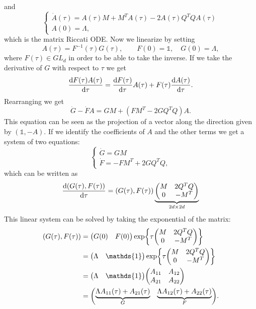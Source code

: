 and
\begin{equation*}
    \begin{cases}
        \dot{A}(\tau) = A(\tau)M + M^TA(\tau) - 2A(\tau)Q^TQA(\tau) \\
        A(0) = \Lambda,
    \end{cases}
\end{equation*}
which is the matrix Riccati ODE. Now we linearize by setting
\begin{equation*}
    A(\tau) = F^{-1}(\tau)G(\tau), \qquad F(0) = \mathds{1}, \quad G(0) = \Lambda,
\end{equation*}
where $F(\tau)\in GL_d$ in order to be able to take the inverse. If we take the derivative of $G$ with respect to $\tau$ we get
\begin{equation*}
    \dv{F(\tau)A(\tau)}{\tau} = \dv{F(\tau)}{\tau} A(\tau) + F(\tau)\dv{A(\tau)}{\tau}.
\end{equation*}
Rearranging we get
\begin{equation}
    \dot{G} - \dot{F}A = GM + (FM^T - 2GQ^TQ)A.
\end{equation}
This equation can be seen as the projection of a vector along the direction given by $(\mathds{1}, -A)$. If we identify the coefficients of $A$ and the other terms we get a system of two equations:
\begin{equation}
    \begin{cases}
        \dot{G} = GM \\
        \dot{F} = -FM^T + 2GQ^TQ,
    \end{cases}
\end{equation}
which can be written as
\begin{equation}
    \dv{(G(\tau), F(\tau))}{\tau} = (G(\tau), F(\tau))\underbrace{\mqty(M & 2Q^TQ \\ 0 & -M^T)}_{2d\times 2d}
\end{equation}
This linear system can be solved by taking the exponential of the matrix:
\begin{align}%
    \notag(G(\tau), F(\tau)) &= \mqty(G(0) & F(0))\exp{\tau\mqty(M & 2Q^TQ \\ 0 & -M^T)} \\
    &=
    \notag\mqty(\Lambda & \mathds{1})\exp{\tau\mqty(M & 2Q^TQ \\ 0 & -M^T)} \\
    &=
    \notag\mqty(\Lambda & \mathds{1})\mqty(A_{11} & A_{12} \\ A_{21} & A_{22}) \\
    &=
    \mqty(\underbrace{\Lambda A_{11}(\tau) + A_{21}(\tau)}_{G} & \underbrace{\Lambda A_{12}(\tau) + A_{22}(\tau)}_{F}).
\end{align}
